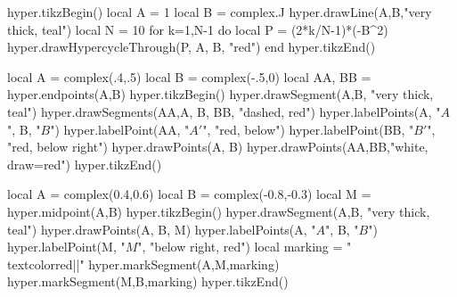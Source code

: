 \documentclass[12pt]{article}
\begin{document}
\begin{codeandresult}
\begin{luacode*}
hyper.tikzBegin()
local A = 1
local B = complex.J
hyper.drawLine(A,B,"very thick, teal")
local N = 10
for k=1,N-1 do
	local P = (2*k/N-1)*(-B^2)
	hyper.drawHypercycleThrough(P, A, B, "red")
end
hyper.tikzEnd()
\end{luacode*}
\end{codeandresult}

\newpage

\begin{codeandresult}
\begin{luacode*}
local A = complex(.4,.5)
local B = complex(-.5,0)
local AA, BB = hyper.endpoints(A,B)
hyper.tikzBegin()
hyper.drawSegment(A,B, "very thick, teal")
hyper.drawSegments(AA,A, B, BB, "dashed, red")
hyper.labelPoints(A, "$A$", B, "$B$")
hyper.labelPoint(AA, "$A'$", "red, below")
hyper.labelPoint(BB, "$B'$", "red, below right")
hyper.drawPoints(A, B)
hyper.drawPoints(AA,BB,"white, draw=red")
hyper.tikzEnd()
\end{luacode*}
\end{codeandresult}

\newpage

\begin{codeandresult}
\begin{luacode*}
local A = complex(0.4,0.6)
local B = complex(-0.8,-0.3)
local M = hyper.midpoint(A,B)
hyper.tikzBegin()
hyper.drawSegment(A,B, "very thick, teal")
hyper.drawPoints(A, B, M)
hyper.labelPoints(A, "$A$", B, "$B$")
hyper.labelPoint(M, "$M$", "below right, red")
local marking = "\\textcolor{red}{||}"
hyper.markSegment(A,M,marking)
hyper.markSegment(M,B,marking)
hyper.tikzEnd()
\end{luacode*}
\end{codeandresult}


\newpage
\end{document}
